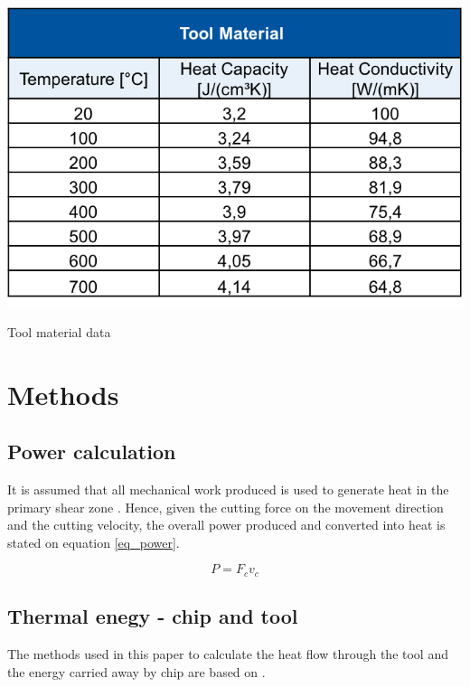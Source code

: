 		\begin{table}[h]
			\centering
			\captionsetup{justification=centering}
			\includegraphics[scale = 0.6]{Imagens/dataTool.png}
			\caption{Tool material data \cite{augspurger2016experimental}}
			\label{tab:dataT}
		\end{table}

	\section{Methods}
	\label{methods}
	
		\subsection{Power calculation}
			It is assumed that all mechanical work produced is used to generate heat in the primary shear zone \cite{abukhshim2006heat}. Hence, given the cutting force on the movement direction and the cutting velocity, the overall power produced and converted into heat is stated on equation \ref{eq_power}.

			\begin{equation} 
			\label{eq_power}
				P = F_{c}v_{c}
			\end{equation}
		
		\subsection{Thermal enegy - chip and tool}
			The methods used in this paper to calculate the heat flow through the tool and the energy carried away by chip are based on \cite{boothroyd1963temperatures}.

